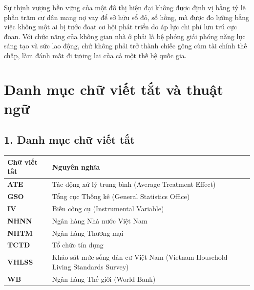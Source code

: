 \documentclass[12pt,a4paper]{report}
\begin{document}
Sự thịnh vượng bền vững của một đô thị hiện đại không được định vị bằng tỷ lệ phần trăm cư dân mang nợ vay để sở hữu sổ đỏ, sổ hồng, mà được đo lường bằng việc không một ai bị tước đoạt cơ hội phát triển do áp lực chi phí lưu trú cực đoan. Với chức năng của không gian nhà ở phải là bệ phóng giải phóng năng lực sáng tạo và sức lao động, chứ không phải trở thành chiếc gông cùm tài chính thế chấp, làm đánh mất đi tương lai của cả một thế hệ quốc gia.

	
\newpage
	\section*{Danh mục chữ viết tắt và thuật ngữ}
	
	\subsection*{1. Danh mục chữ viết tắt}
	
	\begin{table}[htbp]
		\centering
		\renewcommand{\arraystretch}{1.4}
		\begin{tabularx}{\textwidth}{l X}
			\hline
			\textbf{Chữ viết tắt} & \textbf{Nguyên nghĩa} \\
			\hline
			\textbf{ATE} & Tác động xử lý trung bình (Average Treatment Effect) \\
			\textbf{GSO} & Tổng cục Thống kê (General Statistics Office) \\
			\textbf{IV} & Biến công cụ (Instrumental Variable) \\
			\textbf{NHNN} & Ngân hàng Nhà nước Việt Nam \\
			\textbf{NHTM} & Ngân hàng Thương mại \\
			\textbf{TCTD} & Tổ chức tín dụng \\
			\textbf{VHLSS} & Khảo sát mức sống dân cư Việt Nam (Vietnam Household Living Standards Survey) \\
			\textbf{WB} & Ngân hàng Thế giới (World Bank) \\
			\hline
		\end{tabularx}
	\end{table}
	
	\vspace{1cm}
	
\end{document}
